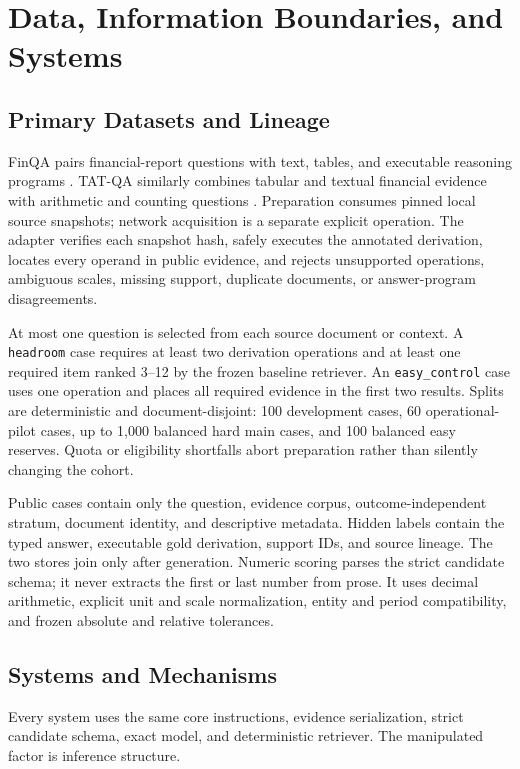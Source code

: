 \section{Data, Information Boundaries, and Systems}

\subsection{Primary Datasets and Lineage}

FinQA pairs financial-report questions with text, tables, and executable
reasoning programs \citep{chen2021finqa}. TAT-QA similarly combines tabular and
textual financial evidence with arithmetic and counting questions
\citep{zhu2021tatqa}. Preparation consumes pinned local source snapshots; network
acquisition is a separate explicit operation. The adapter verifies each snapshot
hash, safely executes the annotated derivation, locates every operand in public
evidence, and rejects unsupported operations, ambiguous scales, missing support,
duplicate documents, or answer-program disagreements.

At most one question is selected from each source document or context. A
\texttt{headroom} case requires at least two derivation operations and at least
one required item ranked 3--12 by the frozen baseline retriever. An
\texttt{easy\_control} case uses one operation and places all required evidence
in the first two results. Splits are deterministic and document-disjoint: 100
development cases, 60 operational-pilot cases, up to 1,000 balanced hard main
cases, and 100 balanced easy reserves. Quota or eligibility shortfalls abort
preparation rather than silently changing the cohort.

Public cases contain only the question, evidence corpus, outcome-independent
stratum, document identity, and descriptive metadata. Hidden labels contain the
typed answer, executable gold derivation, support IDs, and source lineage. The
two stores join only after generation. Numeric scoring parses the strict
candidate schema; it never extracts the first or last number from prose. It uses
decimal arithmetic, explicit unit and scale normalization, entity and period
compatibility, and frozen absolute and relative tolerances.

\subsection{Systems and Mechanisms}

Every system uses the same core instructions, evidence serialization, strict
candidate schema, exact model, and deterministic retriever. The manipulated
factor is inference structure.

